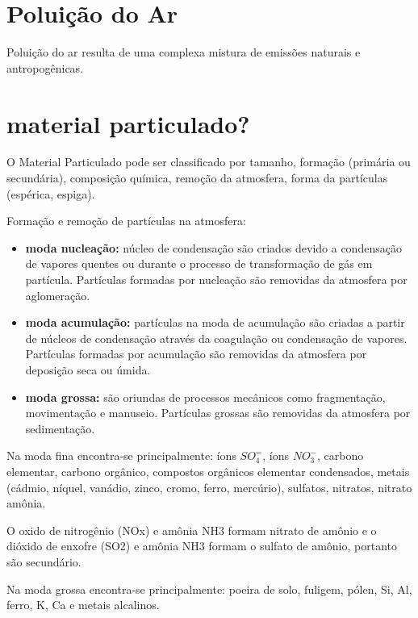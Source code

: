 
\section{Poluição do Ar}

Poluição do ar resulta de uma complexa mistura de emissões naturais e 
antropogênicas.  

\section{material particulado?}

O Material Particulado pode ser classificado por tamanho, formação 
(primária ou secundária), composição química, remoção da atmosfera, 
forma da partículas (espérica, espiga).

Formação e remoção de partículas na atmosfera:
\begin{itemize}
  \item \textbf{moda nucleação:} núcleo de condensação são criados devido a 
        condensação de vapores quentes ou durante o processo de 
        transformação de gás em partícula. Partículas formadas por 
        nucleação são removidas da atmosfera por aglomeração. 
  \item \textbf{moda acumulação:} partículas na moda de acumulação são criadas 
         a partir de núcleos de condensação através da coagulação ou 
         condensação de vapores. Partículas formadas por acumulação
         são removidas da atmosfera por deposição seca ou úmida.
  \item \textbf{moda grossa:} são oriundas de processos mecânicos como fragmentação, 
        movimentação e manuseio. Partículas grossas são removidas da atmosfera 
        por sedimentação.
\end{itemize}


Na moda fina encontra-se principalmente: íons $SO_4^=$, 
íons $ NO_3^-$, carbono elementar, carbono orgânico, compostos orgânicos elementar
condensados, metais (cádmio, níquel, vanádio, zinco, cromo, ferro, mercúrio), 
sulfatos, nitratos, nitrato amônia. 

O oxido de nitrogênio (NOx) e amônia NH3 formam  nitrato de amônio e 
o dióxido de enxofre (SO2) e amônia NH3 formam o sulfato de amônio, 
portanto são secundário. 

Na moda grossa encontra-se principalmente: poeira de solo, fuligem, 
pólen, Si, Al, ferro, K, Ca e metais alcalinos.

